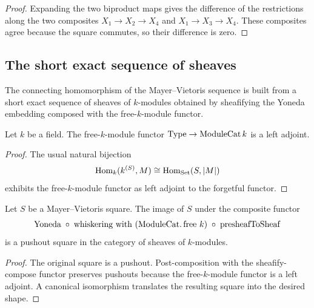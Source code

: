 \begin{proof}
  
  \leanok
  Expanding the two biproduct maps gives the difference of the restrictions along the two composites \(X_1\to X_2\to X_4\) and \(X_1\to X_3\to X_4\). These composites agree because the square commutes, so their difference is zero.
\end{proof}

\subsection{The short exact sequence of sheaves}

The connecting homomorphism of the Mayer--Vietoris sequence is built from a short exact sequence of sheaves of \(k\)-modules obtained by sheafifying the Yoneda embedding composed with the free-\(k\)-module functor.

\begin{definition}\leanok
  \label{def:Scheme_ModuleCat_free_isLeftAdjoint}
  Let \(k\) be a field. The free-\(k\)-module functor \(\mathrm{Type} \to \mathrm{ModuleCat}\,k\) is a left adjoint.
\end{definition}

\begin{proof}
  \leanok
  The usual natural bijection
  \[
    \operatorname{Hom}_k(k^{(S)},M)\cong \operatorname{Hom}_{\mathrm{Set}}(S,|M|)
  \]
  exhibits the free-\(k\)-module functor as left adjoint to the forgetful functor.
\end{proof}

\begin{lemma}\leanok
  \label{lem:Scheme_HModule_prime_isPushoutModuleCatFreeSheaf}

  Let \(S\) be a Mayer--Vietoris square. The image of \(S\) under the composite functor
  \[
    \text{Yoneda} \;\circ\; \text{whiskering with }(\mathrm{ModuleCat}.\operatorname{free}\,k) \;\circ\; \operatorname{presheafToSheaf}
  \]
  is a pushout square in the category of sheaves of \(k\)-modules.
\end{lemma}

\begin{proof}
  
  \leanok
  The original square is a pushout. Post-composition with the sheafify-compose functor preserves pushouts because the free-\(k\)-module functor is a left adjoint. A canonical isomorphism translates the resulting square into the desired shape.
\end{proof}


